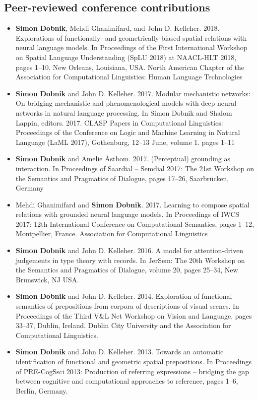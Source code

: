 \documentclass{article}
\begin{document}
\subsection*{Peer-reviewed conference contributions}
\begin{itemize}
\item \textbf{Simon Dobnik}, Mehdi Ghanimifard, and John D. Kelleher. 2018. Explorations of functionally- and geometrically-biased spatial relations with neural language models. In Proceedings of the First International Workshop on Spatial Language Understanding (SpLU 2018) at NAACL-HLT 2018, pages 1–10, New Orleans, Louisiana, USA. North American Chapter of the Association for Computational Linguistics: Human Language Technologies

\item \textbf{Simon Dobnik} and John D. Kelleher. 2017. Modular mechanistic networks: On bridging mechanistic and phenomenological models with deep neural networks in natural language processing. In Simon Dobnik and Shalom Lappin, editors. 2017. CLASP Papers in Computational Linguistics: Proceedings of the Conference on Logic and Machine Learning in Natural Language (LaML 2017), Gothenburg, 12–13 June, volume 1. pages 1–11

\item \textbf{Simon Dobnik} and Amelie \AA stbom. 2017. (Perceptual) grounding as interaction. In Proceedings of Saardial – Semdial 2017: The 21st Workshop on the Semantics and Pragmatics of Dialogue, pages 17–26, Saarbrücken, Germany


\item Mehdi Ghanimifard and \textbf{Simon Dobnik}. 2017. Learning to compose spatial relations with grounded neural language models. In Proceedings of IWCS 2017: 12th International Conference on Computational Semantics, pages 1–12, Montpellier, France. Association for Computational Linguistics

\item \textbf{Simon Dobnik} and John D. Kelleher. 2016. A model for attention-driven judgements in type theory with records. In JerSem: The 20th Workshop on the Semantics and Pragmatics of Dialogue, volume 20, pages 25–34, New Brunswick, NJ USA.


\item \textbf{Simon Dobnik} and John D. Kelleher. 2014. Exploration of functional semantics of prepositions from corpora of descriptions of visual scenes. In Proceedings of the Third V\&L Net Workshop on Vision and Language, pages 33–37, Dublin, Ireland. Dublin City University and the Association for Computational Linguistics.

\item \textbf{Simon Dobnik} and John D. Kelleher. 2013. Towards an automatic identification of functional and geometric spatial prepositions. In Proceedings of PRE-CogSsci 2013: Production of referring expressions – bridging the gap between cognitive and computational approaches to reference, pages 1–6, Berlin, Germany.
\end{itemize}
\end{document}
